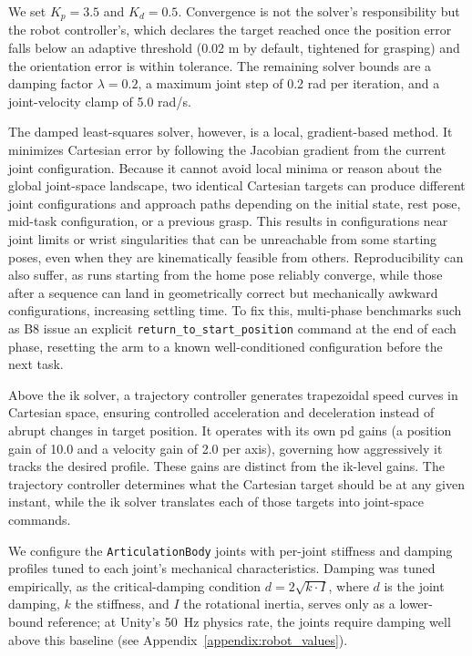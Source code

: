 We set $K_p = 3.5$ and $K_d = 0.5$. Convergence is not the solver's responsibility but the robot controller's, which declares the target reached once the position error falls below an adaptive threshold (0.02 m by default, tightened for grasping) and the orientation error is within tolerance. The remaining solver bounds are a damping factor $\lambda = 0.2$, a maximum joint step of 0.2 rad per iteration, and a joint-velocity clamp of 5.0 rad/s.

The damped least-squares solver, however, is a local, gradient-based method. It minimizes Cartesian error by following the Jacobian gradient from the current joint configuration. Because it cannot avoid local minima or reason about the global joint-space landscape, two identical Cartesian targets can produce different joint configurations and approach paths depending on the initial state, rest pose, mid-task configuration, or a previous grasp. This results in configurations near joint limits or wrist singularities that can be unreachable from some starting poses, even when they are kinematically feasible from others. Reproducibility can also suffer, as runs starting from the home pose reliably converge, while those after a sequence can land in geometrically correct but mechanically awkward configurations, increasing settling time. To fix this, multi-phase benchmarks such as B8 issue an explicit \texttt{return\_to\_start\_position} command at the end of each phase, resetting the arm to a known well-conditioned configuration before the next task.

Above the \gls{ik} solver, a trajectory controller generates trapezoidal speed curves in Cartesian space, ensuring controlled acceleration and deceleration instead of abrupt changes in target position. It operates with its own \gls{pd} gains (a position gain of 10.0 and a velocity gain of 2.0 per axis), governing how aggressively it tracks the desired profile. These gains are distinct from the \gls{ik}-level gains. The trajectory controller determines what the Cartesian target should be at any given instant, while the \gls{ik} solver translates each of those targets into joint-space commands.

We configure the \texttt{ArticulationBody} joints with per-joint stiffness and damping profiles tuned to each joint’s mechanical characteristics. Damping was tuned empirically, as the critical-damping condition $d = 2\sqrt{k \cdot I}$, where $d$ is the joint damping, $k$ the stiffness, and $I$ the rotational inertia, serves only as a lower-bound reference; at Unity’s 50~Hz physics rate, the joints require damping well above this baseline (see Appendix~\ref{appendix:robot_values}).


